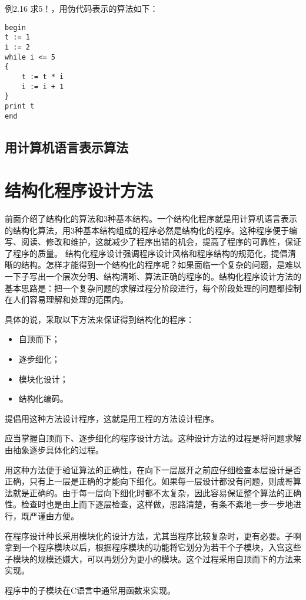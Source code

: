 例2.16 求5！，用伪代码表示的算法如下：

\begin{lstlisting}
begin
t := 1
i := 2
while i <= 5
{
	t := t * i
	i := i + 1
}
print t
end
\end{lstlisting}

\subsection{用计算机语言表示算法}
\section{结构化程序设计方法}

前面介绍了结构化的算法和3种基本结构。一个结构化程序就是用计算机语言表示的结构化算法，用3种基本结构组成的程序必然是结构化的程序。这种程序便于编写、阅读、修改和维护，这就减少了程序出错的机会，提高了程序的可靠性，保证了程序的质量。
结构化程序设计强调程序设计风格和程序结构的规范化，提倡清晰的结构。怎样才能得到一个结构化的程序呢？如果面临一个复杂的问题，是难以一下子写出一个层次分明、结构清晰、算法正确的程序的。结构化程序设计方法的基本思路是：把一个复杂问题的求解过程分阶段进行，每个阶段处理的问题都控制在人们容易理解和处理的范围内。

具体的说，采取以下方法来保证得到结构化的程序：
\begin{itemize}
	\item 自顶而下；
	\item 逐步细化；
	\item 模块化设计；
	\item 结构化编码。
\end{itemize}

提倡用这种方法设计程序，这就是用工程的方法设计程序。

应当掌握自顶而下、逐步细化的程序设计方法。这种设计方法的过程是将问题求解由抽象逐步具体化的过程。

用这种方法便于验证算法的正确性，在向下一层展开之前应仔细检查本层设计是否正确，只有上一层是正确的才能向下细化。如果每一层设计都没有问题，则成哥算法就是正确的。由于每一层向下细化时都不太复杂，因此容易保证整个算法的正确性。检查时也是由上而下逐层检查，这样做，思路清楚，有条不紊地一步一步地进行，既严谨由方便。

在程序设计种长采用模块化的设计方法，尤其当程序比较复杂时，更有必要。子啊拿到一个程序模块以后，根据程序模块的功能将它划分为若干个子模块，入宫这些子模块的规模还嫌大，可以再划分为更小的模块。这个过程采用自顶而下的方法来实现。

程序中的子模块在C语言中通常用函数来实现。

